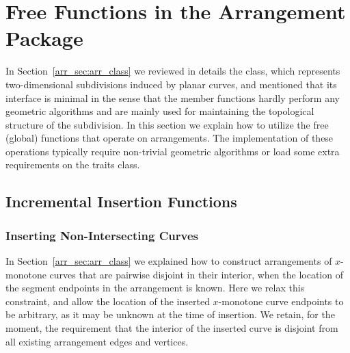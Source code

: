 \section{Free Functions in the Arrangement Package\label{arr_sec:gl_funcs}}

In Section~\ref{arr_sec:arr_class} we reviewed in details the
 class, which represents two-dimensional
subdivisions induced by planar curves, and mentioned that its
interface is minimal in the sense that the member functions hardly
perform any geometric algorithms and are mainly used for
maintaining the topological structure of the subdivision. In this
section we explain how to utilize the free (global) functions that operate
on arrangements. The implementation of these operations typically require
non-trivial geometric algorithms or load some extra requirements on
the traits class.

\subsection{Incremental Insertion Functions\label{arr_ssec:inc_insert}}

\subsubsection{Inserting Non-Intersecting Curves\label{arr_sssec:insert_non_x}}

In Section~\ref{arr_sec:arr_class} we explained how to construct
arrangements of $x$-monotone curves that are pairwise disjoint in
their interior, when the location of the segment endpoints in the
arrangement is known. Here we relax this constraint, and allow the
location of the inserted $x$-monotone curve endpoints to be arbitrary,
as it may be unknown at the time of insertion. We retain, for the moment,
the requirement that the interior of the inserted curve is disjoint from
all existing arrangement edges and vertices.

